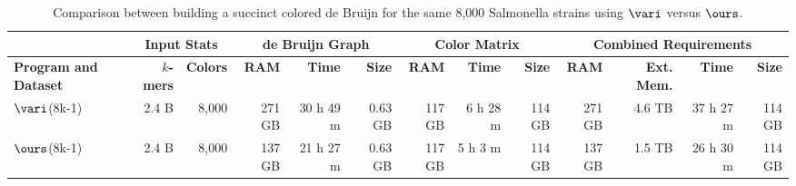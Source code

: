 \begin{table}[t]
\footnotesize
\begin{center}
\begin{tabular}{|l|r|r|r|r|r|r|r|r|r|r|r|r|}
  \hline
  &  \multicolumn{2}{|c|}{Input Stats} & \multicolumn{3}{|c|}{de Bruijn Graph } & \multicolumn{3}{|c|}{Color Matrix } & \multicolumn{4}{|c|}{Combined Requirements}\\
  \hline

\textbf{Program and Dataset} & \textbf{$k$-mers} & \textbf{Colors} & \textbf{ RAM}& \textbf{Time} & \textbf{Size} & \textbf{RAM} &   \textbf{Time} & \textbf{Size} &  \textbf{RAM}  & \textbf{Ext. Mem.}  &   \textbf{Time} & \textbf{Size} \\ 
\hline

$\vari$(8k-1)   & 2.4 B       & 8,000 &              271 GB      & 30 h 49 m & 0.63 GB &              117 GB     & 6 h 28 m   & 114 GB              &    271 GB  & 4.6 TB  & 37 h  27 m &  114 GB \\
$\ours$(8k-1)      & 2.4 B     & 8,000 &              137 GB      & 21 h 27 m & 0.63 GB &              117 GB    & 5 h 3 m    & 114 GB               &    137 GB  & 1.5 TB  & 26 h  30 m & 114 GB\\



\hline

\hline
\end{tabular}
\label{tab:compare}
\caption{Comparison between building a succinct colored de Bruijn for the same 8,000 Salmonella strains using $\vari$ versus $\ours$.}
\end{center}
\end{table}


